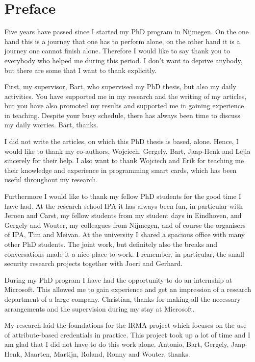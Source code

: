 \chapter*{Preface}

Five years have passed since I started my PhD program in Nijmegen. On the one
hand this is a journey that one has to perform alone, on the other hand it is a
journey one cannot finish alone. Therefore I would like to say thank you to 
everybody who helped me during this period. I don't want to deprive anybody, 
but there are some that I want to thank explicitly.

First, my supervisor, Bart, who supervised my PhD thesis, but also my daily
activities. You have supported me in my research and the writing of my articles,
but you have also promoted my results and supported me in gaining experience in 
teaching. Despite your busy schedule, there has always been time to discuss my 
daily worries. Bart, thanks.

I did not write the articles, on which this PhD thesis is based, alone. Hence,
I would like to thank my co-authors, Wojciech, Gergely, Bart, Jaap-Henk and 
Lejla sincerely for their help. I also want to thank Wojciech and Erik for 
teaching me their knowledge and experience in programming smart cards, which 
has been useful throughout my research.

Furthermore I would like to thank my fellow PhD students for the good time I 
have had. At the research school IPA it has always been fun, in particular with
Jeroen and Carst, my fellow students from my student days in Eindhoven, and 
Gergely and Wouter, my colleagues from Nijmegen, and of course the organisers 
of IPA, Tim and Meivan. At the university I shared a spacious office with many
other PhD students. The joint work, but definitely also the breaks and
conversations made it a nice place to work. I remember, in particular, the 
small security research projects together with Joeri and Gerhard.

During my PhD program I have had the opportunity to do an internship at 
Microsoft. This allowed me to gain experience and get an impression of a 
research department of a large company. Christian, thanks for making all the 
necessary arrangements and the supervision during my stay at Microsoft.

My research laid the foundations for the IRMA project which focuses on the use 
of attribute-based credentials in practice. This project took up a lot of time 
and I am glad that I did not have to do this work alone. Antonio, Bart, Gergely,
Jaap-Henk, Maarten, Martijn, Roland, Ronny and Wouter, thanks.


